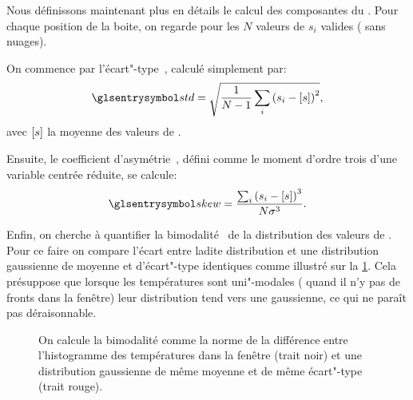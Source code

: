 Nous définissons maintenant plus en détails le calcul des composantes du .
Pour chaque position de la boite, on regarde pour les \(N\) valeurs de  \(s_{i}\) valides ( sans nuages).

On commence par l'écart"-type~, calculé simplement par:
\begin{equation}
  \am{std} = \sqrt{\frac{1}{N-1} \sum_i \paren{s_i - \moy{s}}^2},
\end{equation}
avec \(\left[s\right]\) la moyenne des valeurs de .

Ensuite, le coefficient d'asymétrie~, défini comme le moment d'ordre trois d'une variable centrée réduite, se calcule:
\begin{equation}
  \am{skew} = \frac{\sum_i \paren{s_i - \moy{s}}^3} {N \sigma^3}.
\end{equation}

Enfin, on cherche à quantifier la bimodalité~ de la distribution des valeurs de .
Pour ce faire on compare l'écart entre ladite distribution et une distribution gaussienne de moyenne et d'écart"-type identiques comme illustré sur la \cref{fig:bimodality}.
Cela présuppose que lorsque les températures sont uni"-modales ( quand il n'y pas de fronts dans la fenêtre) leur distribution tend vers une gaussienne, ce qui ne paraît pas déraisonnable.

\begin{figure}
  \centering
  \caption[Illustration du calcul de la bimodalité]{
    On calcule la bimodalité comme la norme de la différence entre l'histogramme des températures dans la fenêtre (trait noir) et une distribution gaussienne de même moyenne et de même écart"-type (trait rouge).
  }
  \label{fig:bimodality}
\end{figure}

